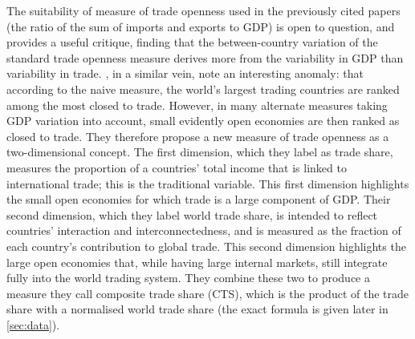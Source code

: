 \documentclass[12pt,a4paper]{article}
\begin{document}
The suitability of measure of trade openness used in the previously cited papers (the ratio of the sum of imports and exports to GDP) is open to question, and \cite{fujiiWhatDoesTrade2019} provides a useful critique, finding that the between-country variation of the standard trade openness measure derives more from the variability in GDP than variability in trade.
\cite{squalliNewMeasureTrade2011}, in a similar vein, note an interesting anomaly: that according to the naive measure, the world’s largest trading countries are ranked among the most closed to trade.
However, in many alternate measures taking GDP variation into account, small evidently open economies are then ranked as closed to trade.
They therefore propose a new measure of trade openness as a two-dimensional concept.
The first dimension, which they label as trade share, measures the proportion of a countries' total income that is linked to international trade; this is the traditional variable.
This first dimension highlights the small open economies for which trade is a large component of GDP.
Their second dimension, which they label world trade share, is intended to reflect countries' interaction and interconnectedness, and is measured as the fraction of each country's contribution to global trade.
This second dimension highlights the large open economies that, while having large internal markets, still integrate fully into the world trading system.
They combine these two to produce a measure they call composite trade share (CTS), which is the product of the trade share with a normalised world trade share (the exact formula is given later in \cref{sec:data}).
\end{document}
